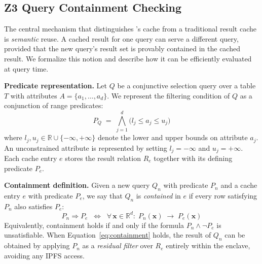 \subsection{Z3 Query Containment Checking}
\label{sec:z3}

The central mechanism that distinguishes \ours{}'s cache from a traditional result cache is \emph{semantic} reuse. A cached result for one query can serve a different query, provided that the new query's result set is provably contained in the cached result.
We formalize this notion and describe how it can be efficiently evaluated at query time.

\textbf{Predicate representation.}
Let $Q$ be a conjunctive selection query over a table $T$ with attributes $A = \{a_1, \ldots, a_d\}$.
We represent the filtering condition of $Q$ as a conjunction of range predicates:
\begin{equation}
    P_Q \;=\; \bigwedge_{j=1}^{d} \bigl(l_j \leq a_j \leq u_j\bigr)
    \label{eq:predicate}
\end{equation}
where $l_j, u_j \in \mathbb{R} \cup \{-\infty, +\infty\}$ denote the lower and upper bounds on attribute $a_j$.
An unconstrained attribute is represented by setting $l_j = -\infty$ and $u_j = +\infty$.
Each cache entry $e$ stores the result relation $R_e$ together with its defining predicate $P_e$.

\textbf{Containment definition.}
Given a new query $Q_n$ with predicate $P_n$ and a cache entry $e$ with predicate $P_e$, we say that $Q_n$ is \emph{contained} in $e$ if every row satisfying $P_n$ also satisfies $P_e$:
\begin{equation}
    P_n \Rightarrow P_e
    \;\;\Longleftrightarrow\;\;
    \forall\, \mathbf{x} \in \mathbb{R}^d :\; P_n(\mathbf{x}) \;\to\; P_e(\mathbf{x})
    \label{eq:containment}
\end{equation}
Equivalently, containment holds if and only if the formula $P_n \wedge \neg P_e$ is unsatisfiable.
When Equation~\ref{eq:containment} holds, the result of $Q_n$ can be obtained by applying $P_n$ as a \emph{residual filter} over $R_e$ entirely within the enclave, avoiding any IPFS access.

